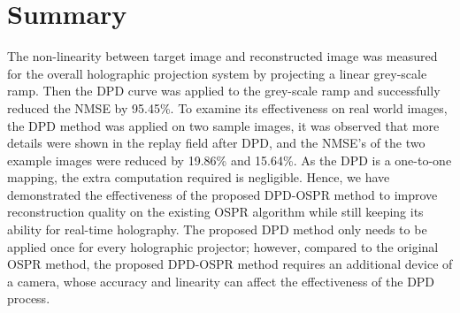 \section{Summary}
The non-linearity between target image and reconstructed image was measured for the overall holographic projection system by projecting a linear grey-scale ramp. Then the DPD curve was applied to the grey-scale ramp and successfully reduced the NMSE by 95.45\%. To examine its effectiveness on real world images, the DPD method was applied on two sample images, it was observed that more details were shown in the replay field after DPD, and the NMSE's of the two example images were reduced by 19.86\% and 15.64\%. As the DPD is a one-to-one mapping, the extra computation required is negligible. Hence, we have demonstrated the effectiveness of the proposed DPD-OSPR method to improve reconstruction quality on the existing OSPR algorithm while still keeping its ability for real-time holography. The proposed DPD method only needs to be applied once for every holographic projector; however, compared to the original OSPR method, the proposed DPD-OSPR method requires an additional device of a camera, whose accuracy and linearity can affect the effectiveness of the DPD process.




